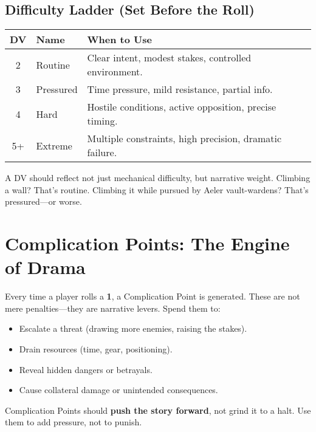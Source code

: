 \subsection*{Difficulty Ladder (Set Before the Roll)}

\begin{center}
\begin{tabular}{cll}
\toprule
\textbf{DV} & \textbf{Name} & \textbf{When to Use} \\
\midrule
2 & Routine\index{Difficulty Value!Routine} & Clear intent, modest stakes, controlled environment. \\
3 & Pressured\index{Difficulty Value!Pressured} & Time pressure, mild resistance, partial info. \\
4 & Hard\index{Difficulty Value!Hard} & Hostile conditions, active opposition, precise timing. \\
5+ & Extreme\index{Difficulty Value!Extreme} & Multiple constraints, high precision, dramatic failure. \\
\bottomrule
\end{tabular}
\end{center}

A DV should reflect not just mechanical difficulty, but narrative weight. Climbing a wall? That's routine. Climbing it while pursued by Aeler vault-wardens? That's pressured---or worse.

\section*{Complication Points: The Engine of Drama}

Every time a player rolls a \textbf{1}, a Complication Point is generated. These are not mere penalties---they are narrative levers. Spend them to:

\begin{itemize}
    \item Escalate a threat (drawing more enemies, raising the stakes).
    \item Drain resources (time, gear, positioning).
    \item Reveal hidden dangers or betrayals.
    \item Cause collateral damage or unintended consequences.
\end{itemize}

Complication Points should \textbf{push the story forward}, not grind it to a halt. Use them to add pressure, not to punish.

